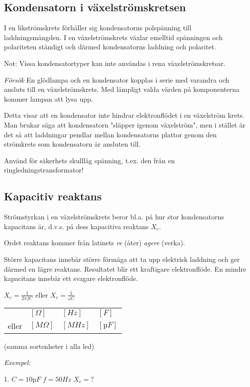 \subsection{Kondensatorn i växelströmskretsen}

I en likströmskrets förhåller sig kondensatorns polspänning till
laddningsmängden. I en växelströmskrets växlar emelltid spänningen och
polariteten ständigt och därmed kondensatorns laddning och polaritet.

Not: Vissa kondensatortyper kan inte användas i rena växelströmskretsar.

\emph{Försök}
En glödlampa och en kondensator kopplas i serie med varandra och ansluts till en
växelströmskrets. Med lämpligt valda värden på komponenterna kommer lampan att
lysa upp.

Detta visar att en kondensator inte hindrar elektronflödet i en växelström
krets. Man brukar säga att kondensatorn "släpper igenom växelström", men i
stället är det så att laddningar pendlar mellan kondensatorns plattor genom den
strömkrets som kondensatorn är ansluten till.

Använd för säkerhets skulllåg spänning, t.ex. den från en
ringledningstransformator!

\subsection{Kapacitiv reaktans}
Strömstyrkan i en växelströmskrets beror bl.a. på hur stor kondensatorns
kapacitans är, d.v.s. på dess kapacitiva reaktans \(X_c\).

Ordet reaktans kommer från latinets \emph{re} (åter) \emph{agere} (verka).

Större kapacitans innebär större förmåga att ta upp elektrisk laddning och ger
därmed en lägre reaktans. Resultatet blir ett kraftigare elektronflöde.
En mindre kapacitans innebär ett svagare elektronflöde.

\(X_c = \frac{1}{2πfC}\) eller \(X_c = \frac{1}{\omega C}\)

\begin{tabular}{llll}
  &  \([\Omega]\) & \([Hz]\) & \([F]\)    \\
  eller & \([M\Omega]\) & \([MHz]\) & \([µF]\)
\end{tabular}

(samma sortenheter i alla led)

\emph{Exempel:}

1. \(C = 10 µF\) \(f = 50 Hz\) \(X_c = ?\)

